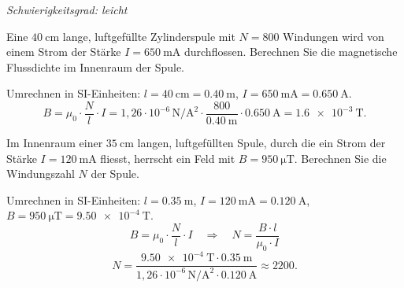 \documentclass[addpoints,11pt,a4paper]{exam}
\newlength{\antwortraumlen}
\newcommand{\Antwortraum}[1]{%
  \pgfmathsetlength{\antwortraumlen}{#1*2.5cm}%
  \begin{answerbox}
    \rule{0pt}{\antwortraumlen}%
  \end{answerbox}%
}
\newcommand{\Schwierigkeit}[1]{%
  \textit{\color{darkgray}Schwierigkeitsgrad: #1}\par\smallskip
}
\begin{document}
\begin{questions}
\begin{taskbox}
\Schwierigkeit{leicht}
\question[2] Eine $\SI{40}{\centi\meter}$ lange, luftgefüllte Zylinderspule
mit $N=800$ Windungen wird von einem Strom der Stärke $I=\SI{650}{\milli\ampere}$
durchflossen. Berechnen Sie die magnetische Flussdichte im Innenraum der
Spule.
\Antwortraum{2}
\begin{solution}
Umrechnen in SI-Einheiten: $l=\SI{40}{\centi\meter}=\SI{0.40}{\meter}$,
$I=\SI{650}{\milli\ampere}=\SI{0.650}{\ampere}$.
\[
  B = \mu_0\cdot\frac{N}{l}\cdot I
    = 1{,}26\cdot10^{-6}\,\si{\newton\per\ampere\squared}\cdot\frac{800}{\SI{0.40}{\meter}}\cdot\SI{0.650}{\ampere}
    = \SI{1.6e-3}{\tesla}.
\]
\end{solution}

\question[3] Im Innenraum einer $\SI{35}{\centi\meter}$ langen,
luftgefüllten Spule, durch die ein Strom der Stärke $I=\SI{120}{\milli\ampere}$
fliesst, herrscht ein Feld mit $B=\SI{950}{\micro\tesla}$. Berechnen Sie
die Windungszahl $N$ der Spule.
\Antwortraum{3}
\begin{solution}
Umrechnen in SI-Einheiten: $l=\SI{0.35}{\meter}$,
$I=\SI{120}{\milli\ampere}=\SI{0.120}{\ampere}$,
$B=\SI{950}{\micro\tesla}=\SI{9.50e-4}{\tesla}$.
\[
  B = \mu_0\cdot\frac{N}{l}\cdot I
  \quad\Longrightarrow\quad
  N = \frac{B\cdot l}{\mu_0\cdot I}
\]
\[
  N = \frac{\SI{9.50e-4}{\tesla}\cdot\SI{0.35}{\meter}}{1{,}26\cdot10^{-6}\,\si{\newton\per\ampere\squared}\cdot\SI{0.120}{\ampere}}
    \approx 2200.
\]
\end{solution}
\end{taskbox}
\end{questions}
\end{document}
